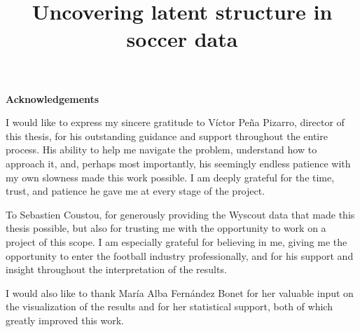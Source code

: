 \documentclass{fmetfm}
\title{Uncovering latent structure in soccer data}
\begin{document}
\maketitle


\cleardoublepage
\thispagestyle{empty}
\null\vspace*{2cm}
\begin{center}\Large\bfseries\color{blau} Acknowledgements\end{center}
\vspace{1cm}

I would like to express my sincere gratitude to V\'ictor Pe\~na Pizarro, director of this thesis, for his outstanding guidance and support throughout the entire process. His ability to help me navigate the problem, understand how to approach it, and, perhaps most importantly, his seemingly endless patience with my own slowness made this work possible. I am deeply grateful for the time, trust, and patience he gave me at every stage of the project.

To Sebastien Coustou, for generously providing the Wyscout data that made this thesis possible, but also for trusting me with the opportunity to work on a project of this scope. I am especially grateful for believing in me, giving me the opportunity to enter the football industry professionally, and for his support and insight throughout the interpretation of the results.

I would also like to thank Mar\'ia Alba Fern\'andez Bonet for her valuable input on the visualization of the results and for her statistical support, both of which greatly improved this work.
\end{document}
